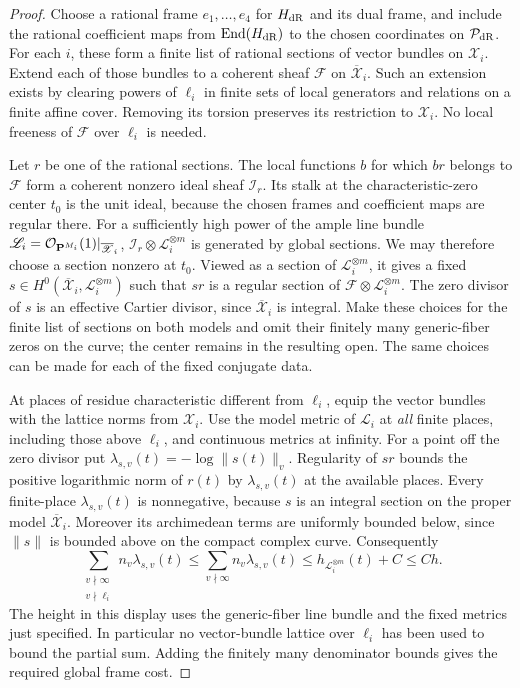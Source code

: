 \begin{proof}
Choose a rational frame $e_1,\ldots,e_4$ for $H_{\rm dR}$ and its
dual frame, and include the rational coefficient maps from
$\operatorname{End}(H_{\rm dR})$ to the chosen coordinates on $\mathcal P_{\rm dR}$.
For each $i$, these form a finite list of rational sections of vector
bundles on $\mathscr X_i$. Extend each of those bundles to a coherent
sheaf $\mathscr F$ on $\overline{\mathscr X}_i$. Such an extension
exists by clearing powers of $\ell_i$ in finite sets of local
generators and relations on a finite affine cover. Removing its
torsion preserves its restriction to $\mathscr X_i$.
No local freeness of $\mathscr F$ over $\ell_i$ is needed.

Let $r$ be one of the rational sections. The local functions $b$ for
which $br$ belongs to $\mathscr F$ form a coherent nonzero ideal
sheaf $\mathscr I_r$. Its stalk at the characteristic-zero center
$t_0$ is the unit ideal, because the chosen frames and coefficient maps
are regular there. For a sufficiently high power of the ample line bundle
$\mathscr L_i=\mathcal O_{\mathbf P^{M_i}}(1)|_{\overline{\mathscr X}_i}$,
$\mathscr I_r\otimes\mathscr L_i^{\otimes m}$ is generated by global
sections. We may therefore choose a section nonzero at $t_0$. Viewed
as a section of $\mathscr L_i^{\otimes m}$, it gives a fixed
$s\in H^0(\overline{\mathscr X}_i,\mathscr L_i^{\otimes m})$
such that $sr$ is a regular section of
$\mathscr F\otimes\mathscr L_i^{\otimes m}$.
The zero divisor of $s$ is an effective Cartier divisor, since
$\overline{\mathscr X}_i$ is integral. Make these choices for the
finite list of sections on both models and omit their finitely many
generic-fiber zeros on the curve; the center remains in the resulting
open. The same choices can be made for each of the fixed conjugate data.

At places of residue characteristic different from $\ell_i$, equip
the vector bundles with the lattice norms from $\mathscr X_i$.
Use the model metric of $\mathscr L_i$ at \emph{all} finite places,
including those above $\ell_i$, and continuous metrics at infinity.
For a point off the zero divisor put
$\lambda_{s,v}(t)=-\log\|s(t)\|_v$.
Regularity of $sr$ bounds the positive logarithmic norm of $r(t)$
by $\lambda_{s,v}(t)$ at the available places. Every finite-place
$\lambda_{s,v}(t)$ is nonnegative, because $s$ is an integral
section on the proper model $\overline{\mathscr X}_i$.
Moreover its archimedean terms are uniformly bounded below, since
$\|s\|$ is bounded above on the compact complex curve. Consequently
\[
 \sum_{\substack{v\nmid\infty\\v\nmid\ell_i}}
       n_v\lambda_{s,v}(t)
 \leq\sum_{v\nmid\infty}n_v\lambda_{s,v}(t)
 \leq h_{\mathscr L_i^{\otimes m}}(t)+C
 \leq Ch.
\]
The height in this display uses the generic-fiber line bundle and
the fixed metrics just specified. In particular no vector-bundle
lattice over $\ell_i$ has been used to bound the partial sum.
Adding the finitely many denominator bounds gives the required
global frame cost.


\end{proof}
